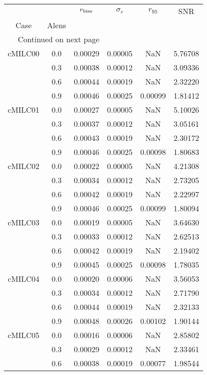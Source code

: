 \begin{longtable}{cccccc}
\toprule
        &     &  $r_{\rm bias}$  &  $\sigma_r$ &  $r_{95}$ &     SNR \\
Case & Alens &                  &             &           &         \\
\midrule
\endhead
\midrule
\multicolumn{3}{r}{{Continued on next page}} \\
\midrule
\endfoot

\bottomrule
\endlastfoot
cMILC00 & 0.0 & 0.00029 & 0.00005 & NaN & 5.76708 \\
        & 0.3 & 0.00038 & 0.00012 & NaN & 3.09336 \\
        & 0.6 & 0.00044 & 0.00019 & NaN & 2.32220 \\
        & 0.9 & 0.00046 & 0.00025 & 0.00099 & 1.81412 \\
cMILC01 & 0.0 & 0.00027 & 0.00005 & NaN & 5.10026 \\
        & 0.3 & 0.00037 & 0.00012 & NaN & 3.05161 \\
        & 0.6 & 0.00043 & 0.00019 & NaN & 2.30172 \\
        & 0.9 & 0.00046 & 0.00025 & 0.00098 & 1.80683 \\
cMILC02 & 0.0 & 0.00022 & 0.00005 & NaN & 4.21308 \\
        & 0.3 & 0.00034 & 0.00012 & NaN & 2.73205 \\
        & 0.6 & 0.00042 & 0.00019 & NaN & 2.22997 \\
        & 0.9 & 0.00046 & 0.00025 & 0.00099 & 1.80094 \\
cMILC03 & 0.0 & 0.00019 & 0.00005 & NaN & 3.64630 \\
        & 0.3 & 0.00033 & 0.00012 & NaN & 2.62513 \\
        & 0.6 & 0.00042 & 0.00019 & NaN & 2.19402 \\
        & 0.9 & 0.00045 & 0.00025 & 0.00098 & 1.78035 \\
cMILC04 & 0.0 & 0.00020 & 0.00006 & NaN & 3.56053 \\
        & 0.3 & 0.00034 & 0.00012 & NaN & 2.71790 \\
        & 0.6 & 0.00044 & 0.00019 & NaN & 2.32133 \\
        & 0.9 & 0.00048 & 0.00026 & 0.00102 & 1.90144 \\
cMILC05 & 0.0 & 0.00016 & 0.00006 & NaN & 2.85802 \\
        & 0.3 & 0.00029 & 0.00012 & NaN & 2.33461 \\
        & 0.6 & 0.00038 & 0.00019 & 0.00077 & 1.98544 \\

\end{longtable}
